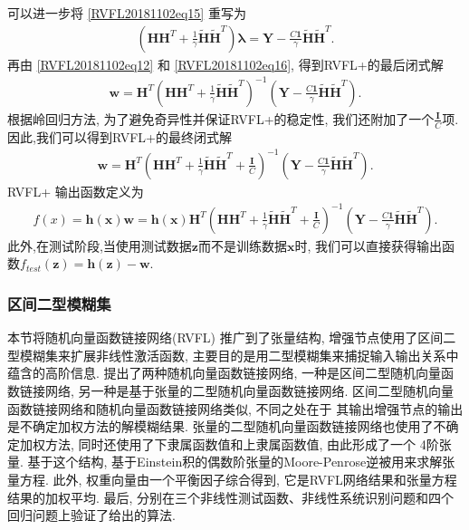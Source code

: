 可以进一步将 \eqref{RVFL20181102eq15} 重写为
\begin{align}
    \left(\bm H \bm H^T  + \frac 1 \gamma \tilde{\bm H} \tilde{\bm H}^T \right )\bm \lambda  = \bm Y - \frac {C \bm 1} {\gamma}\tilde{\bm H} \tilde{\bm H}^T.  \label{RVFL20181102eq16}
\end{align}
再由 \eqref{RVFL20181102eq12} 和 \eqref{RVFL20181102eq16}, 得到RVFL+的最后闭式解
\begin{align}
    \bm  w =\bm H^T \left(\bm H \bm H^T  + \frac 1 \gamma \tilde{\bm H} \tilde{\bm H}^T \right )^{-1} \left(\bm Y - \frac {C \bm 1} {\gamma}\tilde{\bm H} \tilde{\bm H}^T \right ). \label{RVFL20181102eq17}
\end{align}
根据岭回归方法\cite{Bishop2012-6469}, 为了避免奇异性并保证RVFL+的稳定性, 我们还附加了一个$\frac{\bm I}C$项. 因此,我们可以得到RVFL+的最终闭式解
\begin{align}
    \bm w = \bm H^T \left(\bm H \bm H^T  + \frac 1 \gamma \tilde{\bm H} \tilde{\bm H}^T +\frac{ \bm I} C \right)^{-1} \left(\bm Y -\frac {C \bm 1} {\gamma}\tilde{\bm H} \tilde{\bm H}^T \right ).
\label{RVFL20181102eq18}
\end{align}
RVFL+ 输出函数定义为
\begin{align}
    f(x) =\bm  h (\bm x)\bm w =\bm h(\bm  x)\bm H^ T \left(\bm H \bm H^T  +\frac 1 \gamma\tilde{\bm H} \tilde{\bm H}^T  +\frac{\bm  I} C \right)^{-1}\left(\bm Y - \frac {C \bm 1} {\gamma}\tilde{\bm H} \tilde{\bm H}^T \right).
\end{align}
此外,在测试阶段,当使用测试数据$\bm z$而不是训练数据$\bm x$时, 我们可以直接获得输出函数$f_{test}(\bm z)=\bm h(\bm z)-\bm w$.
\subsubsection{区间二型模糊集}
本节将随机向量函数链接网络(RVFL) 推广到了张量结构,  增强节点使用了区间二型模糊集来扩展非线性激活函数, 主要目的是用二型模糊集来捕捉输入输出关系中蕴含的高阶信息.
提出了两种随机向量函数链接网络, 一种是区间二型随机向量函数链接网络, 另一种是基于张量的二型随机向量函数链接网络.
区间二型随机向量函数链接网络和随机向量函数链接网络类似, 不同之处在于 其输出增强节点的输出是不确定加权方法的解模糊结果.
张量的二型随机向量函数链接网络也使用了不确定加权方法, 同时还使用了下隶属函数值和上隶属函数值, 由此形成了一个 4阶张量.
基于这个结构, 基于Einstein积的偶数阶张量的Moore-Penrose逆被用来求解张量方程.
此外, 权重向量由一个平衡因子综合得到, 它是RVFL网络结果和张量方程结果的加权平均.
最后, 分别在三个非线性测试函数、非线性系统识别问题和四个回归问题上验证了给出的算法.

